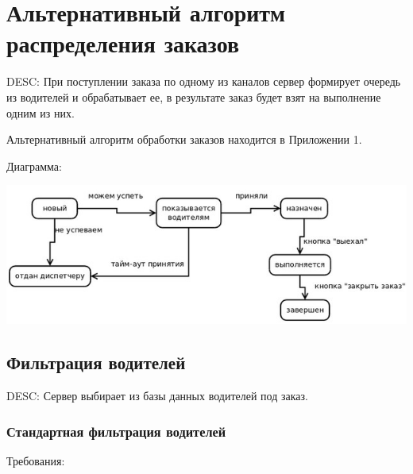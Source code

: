 \section{Альтернативный алгоритм распределения заказов}

	DESC:  При поступлении заказа по одному из каналов сервер формирует очередь из водителей и обрабатывает ее, в результате заказ будет взят на выполнение одним из них.

	Альтернативный алгоритм обработки заказов находится в Приложении 1.

	Диаграмма:

	\includegraphics{images/appendices/alt_alg}

	\subsection{Фильтрация водителей}

		DESC: Сервер выбирает из базы данных водителей под заказ.

		\subsubsection{Стандартная фильтрация водителей}

			Требования:

